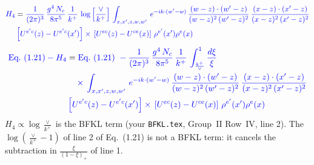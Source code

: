 \documentclass[9pt]{article}
\numberwithin{equation}{section}
\begin{document}
\begin{align*}
{\color{blue}H_4} &= \color{blue}\frac{1}{(2\pi)^{3}}\,\frac{g^{4}\,N_{c}}{8\pi^{5}}\,\frac{1}{k^{+}}\,\log{\left[\frac{\vee}{k^{+}}\right]}\,\int_{x,x',z,w,w'}\,e^{-ik\cdot (w'-w)}\,\frac{(w-z)\cdot(w'-z)}{(w-z)^{2}\,(w'-z)^{2}}\,\frac{(x-z)\cdot(x'-z)}{(x-z)^{2}\,(x'-z)^{2}}\notag \\ & \color{blue}  \left[U^{e'c}(z) - U^{e'c}(x')\right] \times\, \left[U^{ec}(z) - U^{ce}(x)\right]\, \rho^{e'}(x') \rho^{e}(x)
\end{align*}
\begin{align*}
{\color{blue}\text{Eq.~(1.21)} - H_4} &= \color{blue}\text{Eq.~(1.21)}\ -\frac{1}{(2\pi)^{3}}\,\frac{g^{4}\,N_{c}}{8\pi^{5}}\,\frac{1}{k^{+}}\,\int_{\frac{k^{+}}{\vee}}^{1}\frac{d\xi}{\xi}\\ & \color{blue} \quad\times\,\int_{x,x',z,w,w'}\,e^{-ik\cdot (w'-w)}\,\frac{(w-z)\cdot(w'-z)}{(w-z)^{2}\,(w'-z)^{2}}\,\frac{(x-z)\cdot(x'-z)}{(x-z)^{2}\,(x'-z)^{2}}\notag \\ & \color{blue}  \left[U^{e'c}(z) - U^{e'c}(x')\right] \times\, \left[U^{ec}(z) - U^{ce}(x)\right]\, \rho^{e'}(x') \rho^{e}(x)
\end{align*}
{\color{blue}\noindent $H_4\propto\log\frac{\vee}{k^+}$ is the BFKL term (your \texttt{BFKL.tex}, Group~II Row~IV, line 2). The $\log(\frac{\vee}{k^+}-1)$ of line 2 of Eq.~(1.21) is not a BFKL term: it cancels the subtraction in $\frac{\xi}{(1-\xi)_+}$ of line 1.}
\end{document}
